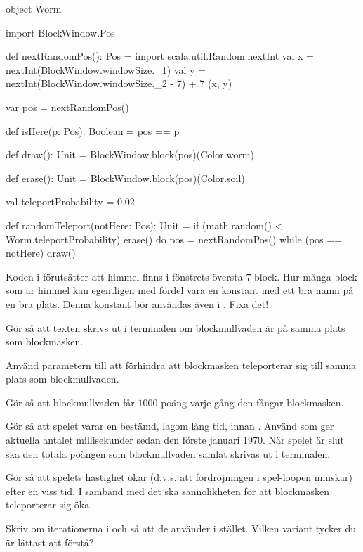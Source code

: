 \begin{Code}
object Worm {
  import BlockWindow.Pos

  def nextRandomPos(): Pos = {
    import scala.util.Random.nextInt
    val x = nextInt(BlockWindow.windowSize._1)
    val y = nextInt(BlockWindow.windowSize._2 - 7) + 7
    (x, y)
  }

  var pos = nextRandomPos()

  def isHere(p: Pos): Boolean = pos == p

  def draw(): Unit  = BlockWindow.block(pos)(Color.worm)

  def erase(): Unit = BlockWindow.block(pos)(Color.soil)

  val teleportProbability = 0.02

  def randomTeleport(notHere: Pos): Unit =
    if (math.random() < Worm.teleportProbability) {
      erase()
      do pos = nextRandomPos() while (pos == notHere)
      draw()
    }
}
\end{Code}

\Subtask Koden i  förutsätter att himmel finns i fönstrets översta $7$ block. Hur många block som är himmel kan egentligen med fördel vara en konstant med ett bra namn på en bra plats. Denna konstant bör användas även i . Fixa det!

\Subtask Gör så att texten  skrivs ut i terminalen om blockmullvaden är på samma plats som blockmasken.

\Subtask Använd parametern  till att förhindra att blockmasken teleporterar sig till samma plats som blockmullvaden.

\Subtask Gör så att blockmullvaden får $1000$ poäng varje gång den fångar blockmasken.

\Subtask Gör så att spelet varar en bestämd, lagom lång tid, innan . Använd  som ger aktuella antalet millisekunder sedan den förste januari 1970. När spelet är slut ska den totala poängen som blockmullvaden samlat skrivas ut i terminalen.

\Subtask Gör så att spelets hastighet ökar (d.v.s. att fördröjningen i spel-loopen minskar) efter en viss tid. I samband med det ska sannolikheten för att blockmasken teleporterar sig öka.

\Task
Skriv om iterationerna i  och  så att de använder  i stället. Vilken variant tycker du är lättast att förstå?
